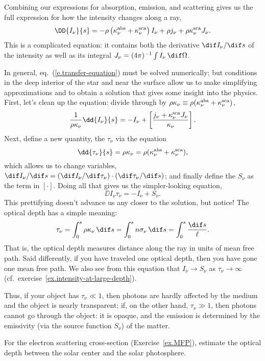Combining our expressions for absorption, emission, and scattering gives us the full expression for how the intensity changes along a ray,
\begin{equation}\label{e.transfer-equation}
\DD{I_{\nu}}{s} = -\rho\left(\kapabs + \kapscat\right) I_{\nu} + \rho j_{\nu} + \rho\kapscat J_{\nu}.
\end{equation}
This is a complicated  equation: it contains both the derivative $\dif I_{\nu}/\dif s$ of the intensity as well as its integral $J_{\nu} = (4\pi)^{-1}\int I_{\nu}\,\dif\Omega$.

In general, eq.~(\ref{e.transfer-equation}) must be solved numerically; but conditions in the deep interior of the star and near the surface allow us to make simplifying approximations and to obtain a solution that gives some insight into the physics. First, let's clean up the equation: divide through by $\rho\kappa_{\nu}\equiv\rho(\kappa_\nu^{\mathrm{abs}} + \kappa_\nu^{\mathrm{sca}})$,
\[
	\frac{1}{\rho\kappa_{\nu}}\dd{I_{\nu}}{s} = -I_{\nu} + \left[\frac{j_{\nu} + \kapscat J_{\nu}}{\kappa_{\nu}}\right].
\]
Next, define a new quantity, the  $\tau_{\nu}$ via the equation
\[
	\dd{\tau_{\nu}}{s} = \rho\kappa_{\nu} = \rho(\kapabs+\kapscat),
\]
which allows us to change variables, $\dif I_{\nu}/\dif s = (\dif I_{\nu}/\dif\tau_{\nu})\cdot(\dif\tau_{\nu}/\dif s)$; and finally define the  $S_{\nu}$ as the term in $\left[\cdot\right]$. Doing all that gives us the simpler-looking equation,
\[
	\DD{I_{\nu}}{\tau_{\nu}} = -I_{\nu} + S_{\nu}.
\]
This prettifying doesn't advance us any closer to the solution, but notice! The optical depth has a simple meaning:
\[
	\tau_{\nu} = \int_{0}^{s} \rho\kappa_{\nu}\,\dif s = \int_{0}^{s} n\sigma_{\nu}\,\dif s = \int_{0}^{s} \frac{\dif s}{\ell}.
\]
That is, the optical depth measures distance along the ray in units of mean free path. Said differently, if you have traveled one optical depth, then you have gone one mean free path. We also see from this equation that $I_{\nu}\to S_{\nu}$ as $\tau_{\nu}\to\infty$ (cf.\ exercise~\ref{ex.intensity-at-large-depth}).

Thus, if your object has $\tau_{\nu}\ll 1$, then photons are hardly affected by the medium and the object is nearly transparent; if, on the other hand, $\tau_{\nu} \gg 1$, then photons cannot go through the object: it is opaque, and the emission is determined by the emissivity (via the source function $S_{\nu}$) of the matter.

\begin{exercisebox}
For the electron scattering cross-section (Exercise~\ref{ex.MFP}), estimate the optical depth between the solar center and the solar photosphere.
\end{exercisebox}

